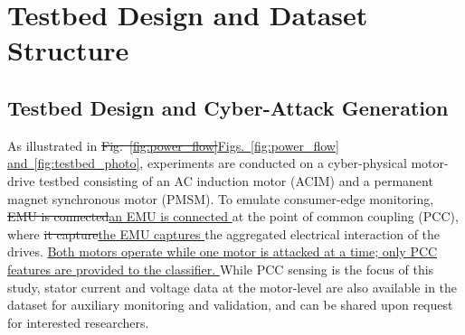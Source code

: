 \documentclass[conference,onecolumn,letterpaper]{IEEEtran} %
\providecommand{\DIFadd}[1]{{\protect\color{blue} \sf #1}} %
\providecommand{\DIFdel}[1]{{\protect\color{red} \scriptsize #1}} %
\providecommand{\DIFaddbegin}{} %
\providecommand{\DIFaddend}{} %
\providecommand{\DIFdelbegin}{} %
\providecommand{\DIFdelend}{} %
\renewcommand{\DIFadd}[1]{{\protect\color{blue}\protect\uline{#1}}}
\renewcommand{\DIFdel}[1]{{\protect\color{red}\protect\sout{#1}}}
\begin{document}
\DIFaddbegin \DIFadd{
}

\DIFaddend \section{Testbed Design and Dataset Structure}

\subsection{Testbed Design and Cyber-Attack Generation}

As illustrated in \DIFdelbegin \DIFdel{Fig.~\mbox{\ref{fig:power_flow}}}\DIFdelend \DIFaddbegin \DIFadd{Figs.~\mbox{\ref{fig:power_flow}} and~\mbox{\ref{fig:testbed_photo}}}\DIFaddend , experiments are conducted on a cyber-physical motor-drive testbed consisting of an AC induction motor (ACIM)  and a permanent magnet synchronous motor (PMSM). To emulate consumer-edge monitoring, \DIFdelbegin \DIFdel{EMU is connected}\DIFdelend \DIFaddbegin \DIFadd{an EMU is connected }\DIFaddend at the point of common coupling (PCC), where \DIFdelbegin \DIFdel{it capture}\DIFdelend \DIFaddbegin \DIFadd{the EMU captures }\DIFaddend the aggregated electrical interaction of the drives. \DIFaddbegin \DIFadd{Both motors operate while one motor is attacked at a time; only PCC features are provided to the classifier. 
}\DIFaddend While PCC sensing is the focus of this study, stator current and voltage data at the motor-level are also available in the dataset for auxiliary monitoring and validation, and can be shared upon request for interested researchers.
\end{document}
